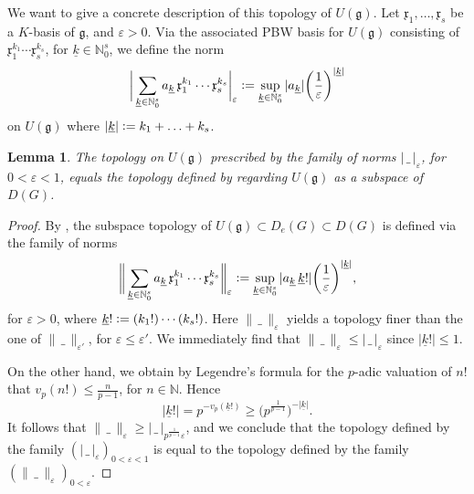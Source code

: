 \documentclass[a4paper, reqno, 10pt]{amsart}
\newtheorem{lemma}[theorem]{Lemma}
\theoremstyle{definition}
\numberwithin{equation}{section}
\newcommand{\abs}[1]{{\lvert{#1}\rvert}}
\newcommand{\blank}{{\,\_\,}}
\newcommand{\defeq}{\vcentcolon=}
\newcommand{\ul}[1]{{\underline{#1}}}
\newcommand{\BN}{{\mathbb {N}}}
\newcommand{\Fg}{{\mathfrak {g}}}
\newcommand{\Fx}{{\mathfrak {x}}}
\begin{document}
We want to give a concrete description of this topology of $U(\Fg)$.
Let $\Fx_1,\ldots,\Fx_s$ be a $K$-basis of $\Fg$, and $\varepsilon >0$.
Via the associated PBW basis for $U(\Fg)$ consisting of $\Fx_1^{k_1} \cdots \Fx_s^{k_s}$, for $\ul{k} \in \BN_0^s$, we define the norm
\begin{equation}\label{Eq 3 - Norms on universal enveloping algebra}
	\bigg\lvert \sum_{\ul{k}\in \BN_0^{s}} a_{\ul{k}} \, \Fx_1^{k_1} \cdots \Fx_s^{k_s} \bigg\rvert_\varepsilon \defeq \sup_{\ul{k}\in \BN_0^{s}} \abs{a_{\ul{k}}} \bigg( \frac{1}{\varepsilon} \bigg)^{\abs{\ul{k}}}
\end{equation}
on $U(\Fg)$ where $\abs{\ul{k}} \defeq k_1 + \ldots +k_s$.




\begin{lemma}\label{Lemma 3 - Subspace topology of universal enveloping algebra is given by family of norms}
	The topology on $U(\Fg)$ prescribed by the family of norms $\abs{\blank}_\varepsilon$, for $0<\varepsilon<1$, equals the topology defined by regarding $U(\Fg)$ as a subspace of $D(G)$.
\end{lemma}
\begin{proof}
	By \cite[Lemma 2.4]{SchneiderTeitelbaum02LocAnDistApplToGL2}, the subspace topology of $U(\Fg) \subset D_e(G)\subset D(G)$ is defined via the family of norms
	\begin{equation*}
		\bigg\lVert \sum_{\ul{k}\in \BN_0^{s}} a_{\ul{k}} \, \Fx_1^{k_1} \cdots \Fx_s^{k_s}  \bigg\rVert_\varepsilon \defeq \sup_{\ul{k}\in \BN_0^{s}} \abs{a_{\ul{k}} \, \ul{k}!} \bigg( \frac{1}{\varepsilon} \bigg)^{\abs{\ul{k}}} ,
	\end{equation*}
	for $\varepsilon >0$, where $\ul{k}! \defeq (k_1 !) \cdots (k_s !)$. 
	Here $\lVert \blank \rVert_\varepsilon$ yields a topology finer than the one of $\lVert \blank \rVert_{\varepsilon'}$, for $\varepsilon \leq \varepsilon'$.
	We immediately find that $\lVert \blank \rVert_\varepsilon \leq \abs{\blank}_\varepsilon$ since $\abs{\ul{k}!} \leq 1$.
	
	
	On the other hand, we obtain by Legendre's formula for the $p$-adic valuation of $n!$ that $v_p(n!) \leq \frac{n}{p-1}$, for $n\in \BN$.
	Hence 
	\begin{equation*}
		\abs{\ul{k}!} = p^{- v_p(\ul{k}!)} \geq \Big( p^{\frac{1}{p-1}}\Big)^{-\abs{\ul{k}}} .
	\end{equation*}
	It follows that $\lVert \blank \rVert_\varepsilon \geq \lvert\blank \rvert_{p^\frac{1}{p-1} \varepsilon}$, and we conclude that the topology defined by the family $(\lvert\blank\rvert_{\varepsilon})_{0<\varepsilon<1}$ is equal to the topology defined by the family $(\lVert\blank\rVert_{\varepsilon})_{0<\varepsilon}$.
\end{proof}
\end{document}
